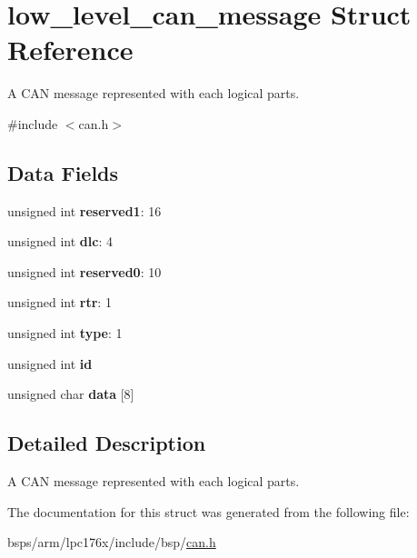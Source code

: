 \hypertarget{structlow__level__can__message}{}\section{low\+\_\+level\+\_\+can\+\_\+message Struct Reference}
\label{structlow__level__can__message}


A C\+AN message represented with each logical parts.  




{\ttfamily \#include $<$can.\+h$>$}

\subsection*{Data Fields}
\begin{DoxyCompactItemize}
\item 
\mbox{\label{structlow__level__can__message_a28975f11e3bf142a8d3ab916139b84e9}} 
unsigned int {\bfseries reserved1}\+: 16
\item 
\mbox{\label{structlow__level__can__message_a56ac75bb67e772fadb75d7b828d4425e}} 
unsigned int {\bfseries dlc}\+: 4
\item 
\mbox{\label{structlow__level__can__message_a221da2afcb2fd2a20ea340eea9ed66c9}} 
unsigned int {\bfseries reserved0}\+: 10
\item 
\mbox{\label{structlow__level__can__message_ab15db158dacba5d4fdf5637359a2d362}} 
unsigned int {\bfseries rtr}\+: 1
\item 
\mbox{\label{structlow__level__can__message_ab6a95e4997d5ae0d555744bcd7f24a9a}} 
unsigned int {\bfseries type}\+: 1
\item 
\mbox{\label{structlow__level__can__message_aac75b96a0276645d60b6f41d67fe0584}} 
unsigned int {\bfseries id}
\item 
\mbox{\label{structlow__level__can__message_a78e1e373338a71fe51a4d2ecd8e9b121}} 
unsigned char {\bfseries data} \mbox{[}8\mbox{]}
\end{DoxyCompactItemize}


\subsection{Detailed Description}
A C\+AN message represented with each logical parts. 

The documentation for this struct was generated from the following file\+:\begin{DoxyCompactItemize}
\item 
bsps/arm/lpc176x/include/bsp/\mbox{\hyperlink{can_8h}{can.\+h}}\end{DoxyCompactItemize}
